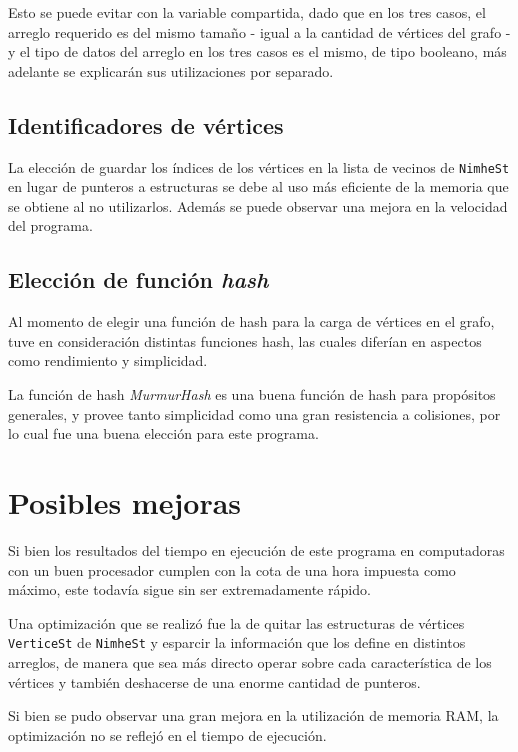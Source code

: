 \documentclass[11pt,a4paper]{article}
\theoremstyle{plain}
\begin{document}
Esto se puede evitar con la variable compartida, dado que en los tres casos, el arreglo requerido es del mismo tamaño - igual a la cantidad de vértices del grafo - y el tipo de datos del arreglo en los tres casos es el mismo, de tipo booleano, más adelante se explicarán sus utilizaciones por separado.

	\subsection{Identificadores de vértices}
	\label{sec:7.7}
	
La elección de guardar los índices de los vértices en la lista de vecinos de \texttt{NimheSt} en lugar de punteros a estructuras se debe al uso más eficiente de la memoria que se obtiene al no utilizarlos. Además se puede observar una mejora en la velocidad del programa. 

	\subsection{Elección de función \emph{hash}}
	\label{sec:7.8}

Al momento de elegir una función de hash para la carga de vértices en el grafo, tuve en consideración distintas funciones hash, las cuales diferían en aspectos como rendimiento y simplicidad.

La función de hash \emph{MurmurHash} es una buena función de hash para propósitos generales, y provee tanto simplicidad como una gran resistencia a colisiones, por lo cual fue una buena elección para este programa.\cite {9}

\section{Posibles mejoras}

Si bien los resultados del tiempo en ejecución de este programa en computadoras con un buen procesador cumplen con la cota de una hora impuesta como máximo, este todavía sigue sin ser extremadamente rápido.

Una optimización que se realizó fue la de quitar las estructuras de vértices \texttt{VerticeSt} de \texttt{NimheSt} y esparcir la información que los define en distintos arreglos, de manera que sea más directo operar sobre cada característica de los vértices y también deshacerse de una enorme cantidad de punteros.

Si bien se pudo observar una gran mejora en la utilización de memoria RAM, la optimización no se reflejó en el tiempo de ejecución.
\end{document}
